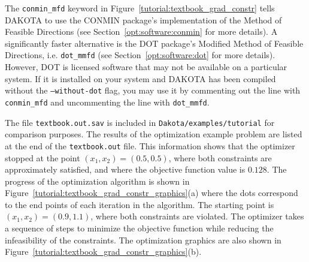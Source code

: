 The \texttt{conmin\_mfd} keyword in Figure~\ref{tutorial:textbook_grad_constr} 
tells DAKOTA to use the CONMIN package's implementation of the
Method of Feasible Directions (see Section~\ref{opt:software:conmin} 
for more details).  A significantly faster alternative is the DOT package's 
Modified Method of Feasible Directions, i.e. \texttt{dot\_mmfd} (see 
Section~\ref{opt:software:dot} for more details).  However, DOT is 
licensed software that may not be available on a particular system.  If it 
is installed on your system and DAKOTA has been compiled without the 
\texttt{--without-dot} flag, you may use it by commenting out the line with
\texttt{conmin\_mfd} and uncommenting the line with \texttt{dot\_mmfd}.

The file \texttt{textbook.out.sav} is included in
\texttt{Dakota/examples/tutorial} for comparison purposes. The
results of the optimization example problem are listed at the end of
the \texttt{textbook.out} file. This information shows that the
optimizer stopped at the point $(x_1,x_2) = (0.5,0.5)$, where both
constraints are approximately satisfied, and where the objective function value is
$0.128$. The progress of the optimization algorithm is shown in
Figure~\ref{tutorial:textbook_grad_constr_graphics}(a) where the
dots correspond to the end points of each iteration in the algorithm.  The
starting point is $(x_1,x_2) = (0.9,1.1)$, where both constraints
are violated. The optimizer takes a
sequence of steps to minimize the objective function while reducing
the infeasibility of the constraints.
The optimization graphics are also shown in
Figure~\ref{tutorial:textbook_grad_constr_graphics}(b).

